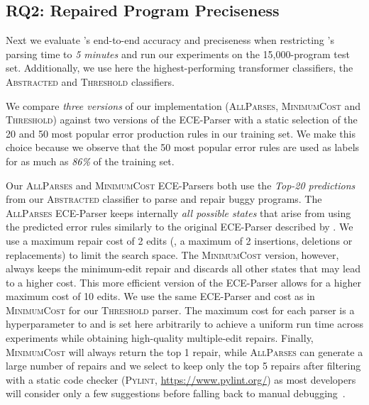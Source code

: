 \subsection{RQ2: Repaired Program Preciseness}
\label{sec:eval:precise}

Next we evaluate \toolname's end-to-end accuracy and preciseness when
restricting
\toolname's parsing time to \emph{5 minutes} and run our experiments on the
15,000-program test set. Additionally, we use here the highest-performing
transformer classifiers, \ie the \textsc{Abstracted} and \textsc{Threshold}
classifiers.

We compare \emph{three versions} of our \toolname implementation
(\textsc{AllParses}, \textsc{MinimumCost} and \textsc{Threshold}) against two
versions of the ECE-Parser with a static selection of the 20 and 50 most popular
error production rules in our training set. We make this choice because we
observe that the 50 most popular error rules are used as labels for as much as
\emph{86\%} of the training set.

Our \textsc{AllParses} and \textsc{MinimumCost} ECE-Parsers both use the
\emph{Top-20 predictions} from our \textsc{Abstracted} classifier to parse and
repair buggy programs. The \textsc{AllParses} ECE-Parser keeps internally
\emph{all possible states} that arise from using the predicted error rules
similarly to the original ECE-Parser described by \citet{Aho_1972}. We use a
maximum repair cost of 2 edits (\ie, a maximum of 2 insertions, deletions or
replacements) to limit the search space. The \textsc{MinimumCost} version,
however, always keeps the minimum-edit repair and discards all other states that
may lead to a higher cost. This more efficient version of the ECE-Parser allows
for a higher maximum cost of 10 edits. We use the same ECE-Parser and cost as in
\textsc{MinimumCost} for our \textsc{Threshold} parser. The maximum cost for
each parser is a hyperparameter to \toolname{} and is set here arbitrarily
to achieve a uniform run time across experiments while obtaining
high-quality multiple-edit repairs. Finally, \textsc{MinimumCost} will always
return the top 1 repair, while \textsc{AllParses} can generate a large number of
repairs and we select to keep only the top 5 repairs after filtering with a
static code checker (\textsc{Pylint}, \url{https://www.pylint.org/}) as most
developers will consider only a few suggestions before falling back to manual
debugging~\citep{Kochhar2016-oc, Parnin2011-ce}.

